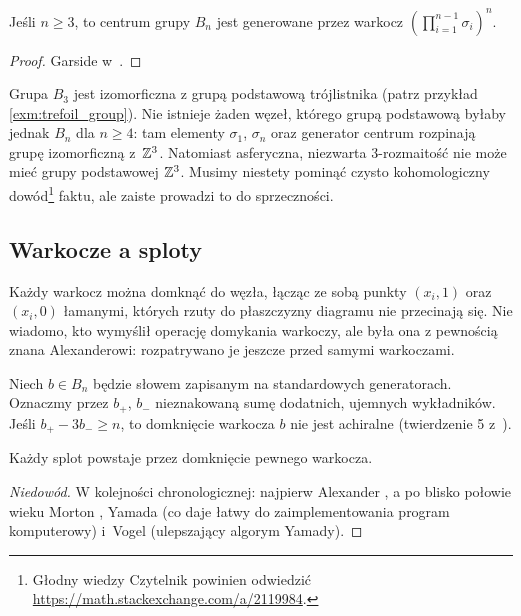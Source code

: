 \begin{proposition}
    Jeśli $n \ge 3$, to centrum grupy $B_n$ jest generowane przez warkocz $(\prod_{i = 1}^{n-1} \sigma_i)^n$.
\end{proposition}

\begin{proof}
%
    Garside w~\cite{garside69}.
\end{proof}

Grupa $B_3$ jest izomorficzna z grupą podstawową trójlistnika (patrz przykład \ref{exm:trefoil_group}).
Nie istnieje żaden węzeł, którego grupą podstawową byłaby jednak $B_n$ dla $n \ge 4$: tam elementy $\sigma_1$, $\sigma_n$ oraz generator centrum rozpinają grupę izomorficzną z~$\mathbb Z^3$.
Natomiast asferyczna, niezwarta 3-rozmaitość nie może mieć grupy podstawowej $\mathbb Z^3$.
Musimy niestety pominąć czysto kohomologiczny dowód\footnote{Głodny wiedzy Czytelnik powinien odwiedzić \url{https://math.stackexchange.com/a/2119984}.} faktu, ale zaiste prowadzi to do sprzeczności.

\subsection{Warkocze a sploty}
Każdy warkocz można domknąć do węzła, łącząc ze sobą punkty $(x_i, 1)$ oraz $(x_i, 0)$
łamanymi, których rzuty do płaszczyzny diagramu nie przecinają się.
%
Nie wiadomo, kto wymyślił operację domykania warkoczy, ale była ona z pewnością znana Alexanderowi: rozpatrywano je jeszcze przed samymi warkoczami.
%

Niech $b \in B_n$ będzie słowem zapisanym na standardowych generatorach.
Oznaczmy przez $b_+$, $b_-$ nieznakowaną sumę dodatnich, ujemnych wykładników.
Jeśli $b_+ - 3b_- \ge n$, to domknięcie warkocza $b$ nie jest achiralne (twierdzenie 5 z~\cite{jones85}).
%

\begin{theorem}[Alexander, 1923]
     Każdy splot powstaje przez domknięcie pewnego warkocza.
\end{theorem}

\begin{proof}[Niedowód]
%
%
%
%
    W kolejności chronologicznej:
    najpierw Alexander \cite{alexander23},
    a po blisko połowie wieku Morton \cite{mortonhr86},
    Yamada \cite{yamada87} (co daje łatwy do zaimplementowania program komputerowy)
    i~Vogel \cite{vogel90} (ulepszający algorym Yamady).
\end{proof}

